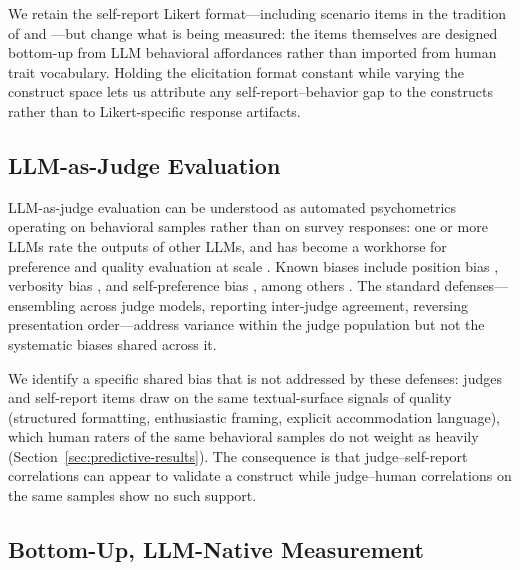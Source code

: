 \documentclass[11pt]{article}
\begin{document}
We retain the self-report Likert format---including scenario items in the tradition of \citet{lee2025trait} and \citet{li2024psychometrics}---but change what is being measured: the items themselves are designed bottom-up from LLM behavioral affordances rather than imported from human trait vocabulary.
Holding the elicitation format constant while varying the construct space lets us attribute any self-report--behavior gap to the constructs rather than to Likert-specific response artifacts.

\subsection{LLM-as-Judge Evaluation}
\label{sec:rw-judge}

LLM-as-judge evaluation can be understood as automated psychometrics operating on behavioral samples rather than on survey responses: one or more LLMs rate the outputs of other LLMs, and has become a workhorse for preference and quality evaluation at scale \citep{zheng2023judging}.
Known biases include position bias \citep{shi2025judgingjudgessystematicstudy}, verbosity bias \citep{saito2023verbositybiaspreferencelabeling, dubois2025lengthcontrolledalpacaevalsimpleway}, and self-preference bias \citep{wataoka2025selfpreferencebiasllmasajudge}, among others \citep{gao2026evaluatingmitigatingllmasajudgebias}.
The standard defenses---ensembling across judge models, reporting inter-judge agreement, reversing presentation order---address variance within the judge population but not the systematic biases shared across it.

We identify a specific shared bias that is not addressed by these defenses: judges and self-report items draw on the same textual-surface signals of quality (structured formatting, enthusiastic framing, explicit accommodation language), which human raters of the same behavioral samples do not weight as heavily (Section~\ref{sec:predictive-results}).
The consequence is that judge--self-report correlations can appear to validate a construct while judge--human correlations on the same samples show no such support.

\subsection{Bottom-Up, LLM-Native Measurement}
\label{sec:rw-native}
\end{document}
